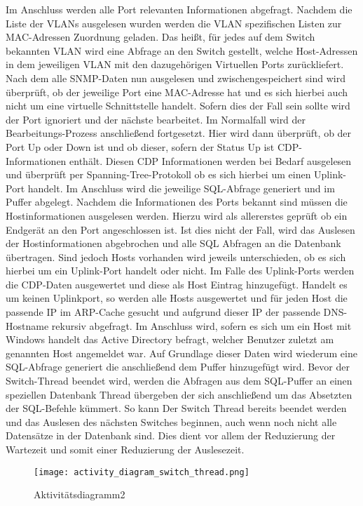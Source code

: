 Im Anschluss werden alle Port relevanten Informationen abgefragt. 
Nachdem die Liste der VLANs ausgelesen wurden werden die VLAN spezifischen Listen zur MAC-Adressen Zuordnung geladen. Das heißt, für jedes auf dem Switch bekannten VLAN wird eine Abfrage an den Switch gestellt, welche Host-Adressen in dem jeweiligen VLAN mit den dazugehörigen Virtuellen Ports zurückliefert.
Nach dem alle SNMP-Daten nun ausgelesen und zwischengespeichert sind wird überprüft, ob der jeweilige Port eine MAC-Adresse hat und es sich hierbei auch nicht um eine virtuelle Schnittstelle handelt. Sofern dies der Fall sein sollte wird der Port ignoriert und der nächste bearbeitet. Im Normalfall wird der Bearbeitungs-Prozess anschließend fortgesetzt. Hier wird dann überprüft, ob der Port Up oder Down ist und ob dieser, sofern der Status Up ist CDP-Informationen enthält. Diesen CDP Informationen werden bei Bedarf ausgelesen und überprüft per Spanning-Tree-Protokoll ob es sich hierbei um einen Uplink-Port handelt. Im Anschluss wird die jeweilige SQL-Abfrage generiert und im Puffer abgelegt.
Nachdem die Informationen des Ports bekannt sind müssen die Hostinformationen ausgelesen werden. Hierzu wird als allererstes geprüft ob ein Endgerät an den Port angeschlossen ist. Ist dies nicht der Fall, wird das Auslesen der Hostinformationen abgebrochen und alle SQL Abfragen an die Datenbank übertragen. Sind jedoch Hosts vorhanden wird jeweils unterschieden, ob es sich hierbei um ein Uplink-Port handelt oder nicht. Im Falle des Uplink-Ports werden die CDP-Daten ausgewertet und diese als Host Eintrag hinzugefügt. Handelt es um keinen Uplinkport, so werden alle Hosts ausgewertet und für jeden Host die passende IP im ARP-Cache gesucht und aufgrund dieser IP der passende DNS-Hostname rekursiv abgefragt.
Im Anschluss wird, sofern es sich um ein Host mit Windows handelt das Active Directory befragt, welcher Benutzer zuletzt am genannten Host angemeldet war. Auf Grundlage dieser Daten wird wiederum eine SQL-Abfrage generiert die anschließend dem Puffer hinzugefügt wird.
Bevor der Switch-Thread beendet wird, werden die Abfragen aus dem SQL-Puffer an einen speziellen Datenbank Thread übergeben der sich anschließend um das Absetzten der SQL-Befehle kümmert. So kann Der Switch Thread bereits beendet werden und das Auslesen des nächsten Switches beginnen, auch wenn noch nicht alle Datensätze in der Datenbank sind. Dies dient vor allem der Reduzierung der Wartezeit und somit einer Reduzierung der Auslesezeit.

\begin{figure}[H]
\centering
\texttt{[image: activity\_diagram\_switch\_thread.png]}
\caption{Aktivitätsdiagramm2}
\label{fig:activitydiagram2}
\end{figure}

